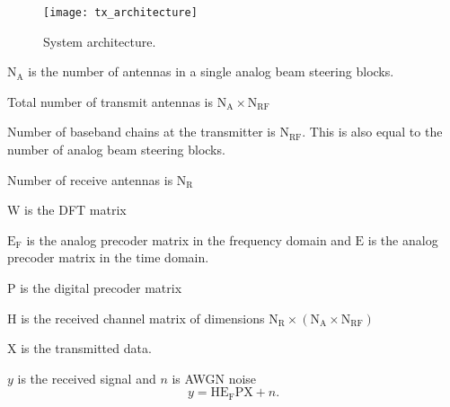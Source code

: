 \begin{figure}[ht]
	\begin{center}
		\texttt{[image: tx\_architecture]}
	\end{center}
	\caption{System architecture.}
	\label{fig:sm}
\end{figure}

$\text{N}_\text{A}$ is the number of antennas in a single analog beam steering blocks.

Total number of transmit antennas is $\text{N}_\text{A}\times\text{N}_\text{RF}$

Number of baseband  chains at the transmitter is $\text{N}_\text{RF}$. This is also equal to the number of analog beam steering blocks.

Number of receive antennas is $\text{N}_\text{R}$

$\text{W}$ is the DFT matrix

$\text{E}_\text{F}$ is the analog precoder matrix in the frequency domain and $\text{E}$ is the analog precoder matrix in the time domain.

$\text{P}$ is the digital precoder matrix

$\text{H}$ is the received channel matrix of dimensions $\text{N}_\text{R} \times (\text{N}_\text{A}\times\text{N}_\text{RF})$

$\text{X}$ is the transmitted data.

$y$ is the received signal and $n$ is AWGN noise
\begin{equation}
y = \text{H}\text{E}_\text{F}\text{P}\text{X} + n. 
\label{eq:y}
\end{equation}


